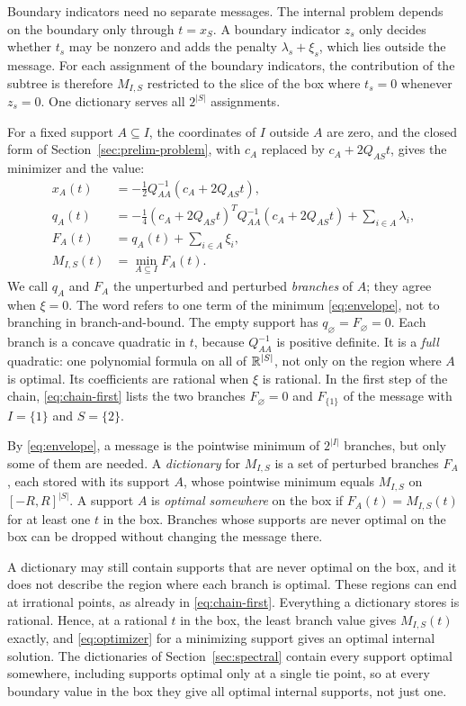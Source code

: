 Boundary indicators need no separate messages. The internal problem
depends on the boundary only through $t=x_S$. A boundary indicator $z_s$
only decides whether $t_s$ may be nonzero and adds the penalty
$\lambda_s+\xi_s$, which lies outside the message. For each assignment of
the boundary indicators, the contribution of the subtree is therefore
$M_{I,S}$ restricted to the slice of the box where $t_s=0$ whenever
$z_s=0$. One dictionary serves all $2^{|S|}$ assignments.

For a fixed support $A\subseteq I$, the coordinates of $I$ outside $A$
are zero, and the closed form of Section~\ref{sec:prelim-problem}, with
$c_A$ replaced by $c_A+2Q_{AS}t$, gives the minimizer and the value:
\begin{align}
 x_A(t)&=-\tfrac12Q_{AA}^{-1}(c_A+2Q_{AS}t),\label{eq:optimizer}\\
 q_A(t)&=-\tfrac14(c_A+2Q_{AS}t)^TQ_{AA}^{-1}
                    (c_A+2Q_{AS}t)+\sum_{i\in A}\lambda_i,\label{eq:branch}\\
 F_A(t)&=q_A(t)+\sum_{i\in A}\xi_i,\label{eq:noisybranch}\\
 M_{I,S}(t)&=\min_{A\subseteq I}F_A(t).
 \label{eq:envelope}
\end{align}
We call $q_A$ and $F_A$ the unperturbed and perturbed \emph{branches} of
$A$; they agree when $\xi=0$. The word refers to one term of the minimum
\eqref{eq:envelope}, not to branching in branch-and-bound. The empty
support has $q_\varnothing=F_\varnothing=0$. Each branch is a concave
quadratic in $t$, because $Q_{AA}^{-1}$ is positive definite. It is a
\emph{full} quadratic: one polynomial formula on all of $\mathbb R^{|S|}$, not
only on the region where $A$ is optimal. Its coefficients are rational
when $\xi$ is rational. In the first step of the chain,
\eqref{eq:chain-first} lists the two branches $F_\varnothing=0$ and
$F_{\{1\}}$ of the message with $I=\{1\}$ and $S=\{2\}$.

By \eqref{eq:envelope}, a message is the pointwise minimum of $2^{|I|}$
branches, but only some of them are needed. A \emph{dictionary} for
$M_{I,S}$ is a set of perturbed branches $F_A$, each stored with its
support $A$, whose pointwise minimum equals $M_{I,S}$ on
$[-R,R]^{|S|}$. A support $A$ is \emph{optimal somewhere} on the box if
$F_A(t)=M_{I,S}(t)$ for at least one $t$ in the box. Branches whose
supports are never optimal on the box can be dropped without changing
the message there.

A dictionary may still contain supports that are never optimal on the
box, and it does not describe the region where each branch is optimal.
These regions can end at irrational points, as already in
\eqref{eq:chain-first}. Everything a dictionary stores is rational.
Hence, at a rational $t$ in the box, the least branch value gives
$M_{I,S}(t)$ exactly, and \eqref{eq:optimizer} for a minimizing support
gives an optimal internal solution. The dictionaries of
Section~\ref{sec:spectral} contain every support optimal somewhere,
including supports optimal only at a single tie point, so at every
boundary value in the box they give all optimal internal supports, not
just one.

